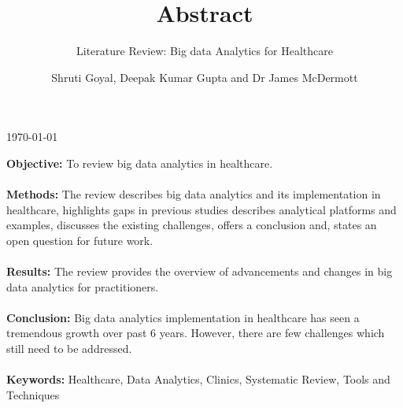 \documentclass[paper=a4, fontsize=11pt]{scrartcl} %
\begin{document}
\begin{titlepage}
\vspace{3cm}
{\large \today}\\[1cm] %
\vfill %
\end{titlepage}



\tableofcontents
\cleardoublepage
{}
\listoffigures
\cleardoublepage
{}
\listoftables
\cleardoublepage
{}
\cleardoublepage
\clearpage

\subtitle{\normalsize{Literature Review: Big data Analytics for Healthcare}}
\title{Abstract}
\author{\small{Shruti Goyal, Deepak Kumar Gupta and Dr James McDermott}}
\date{}
\maketitle
\textbf{Objective:} To review big data analytics in healthcare.
\\
\\
\textbf{Methods:} The review describes big data analytics and its implementation in healthcare, highlights gaps in previous studies describes analytical platforms and examples, discusses the existing challenges, offers a conclusion and, states an open question for future work.
\\
\\
\textbf{Results:} The review provides the overview of advancements and changes in big data analytics for 
practitioners.
\\
\\
\textbf{Conclusion:} Big data analytics implementation in healthcare has seen a tremendous growth over past 6 years. However, there are few challenges which still need to be addressed.
\\ 
\\
\textbf{Keywords:} Healthcare, Data Analytics, Clinics, Systematic Review, Tools and Techniques
\begin{abstract}
\end{abstract}
\newpage 
{}
\end{document}
